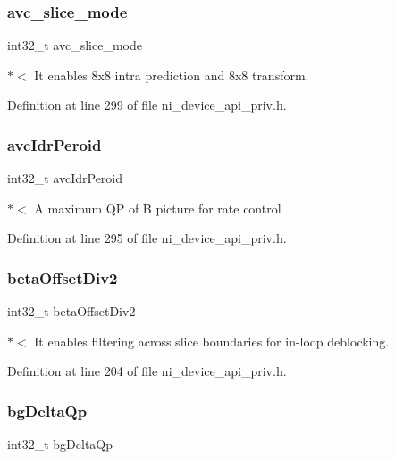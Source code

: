 \subsubsection{\texorpdfstring{avc\_slice\_mode}{avc\_slice\_mode}}
{\footnotesize\ttfamily int32\+\_\+t avc\+\_\+slice\+\_\+mode}

$\ast$$<$ It enables 8x8 intra prediction and 8x8 transform. 

Definition at line 299 of file ni\+\_\+device\+\_\+api\+\_\+priv.\+h.

\mbox{\label{struct__ni__t408__config__t_ab718d3584a122f4440fcc2acf3268609}} 
\subsubsection{\texorpdfstring{avcIdrPeroid}{avcIdrPeroid}}
{\footnotesize\ttfamily int32\+\_\+t avc\+Idr\+Peroid}

$\ast$$<$ A maximum QP of B picture for rate control 

Definition at line 295 of file ni\+\_\+device\+\_\+api\+\_\+priv.\+h.

\mbox{\label{struct__ni__t408__config__t_a4025d29cf80610df5b8debd77941bba1}} 
\subsubsection{\texorpdfstring{betaOffsetDiv2}{betaOffsetDiv2}}
{\footnotesize\ttfamily int32\+\_\+t beta\+Offset\+Div2}

$\ast$$<$ It enables filtering across slice boundaries for in-\/loop deblocking. 

Definition at line 204 of file ni\+\_\+device\+\_\+api\+\_\+priv.\+h.

\mbox{\label{struct__ni__t408__config__t_ace278eba9933c8ae9d069285e2b1fb28}} 
\subsubsection{\texorpdfstring{bgDeltaQp}{bgDeltaQp}}
{\footnotesize\ttfamily int32\+\_\+t bg\+Delta\+Qp}

